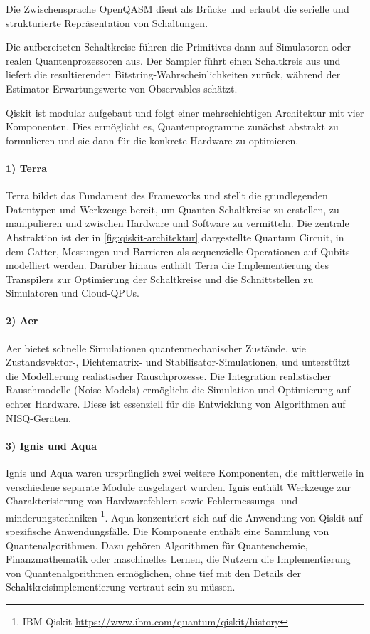 Die Zwischensprache OpenQASM dient als Brücke und erlaubt die serielle und strukturierte Repräsentation von Schaltungen. \autocite{cross_open_2017}

Die aufbereiteten Schaltkreise führen die Primitives dann auf Simulatoren oder realen Quantenprozessoren aus. Der Sampler führt einen Schaltkreis aus und liefert die resultierenden Bitstring-Wahrscheinlichkeiten zurück, während der Estimator Erwartungswerte von Observables schätzt.

Qiskit ist modular aufgebaut und folgt einer mehrschichtigen Architektur mit vier Komponenten. Dies ermöglicht es, Quantenprogramme zunächst abstrakt zu formulieren und sie dann für die konkrete Hardware zu optimieren. \autocite{javadi-abhari_quantum_2024}
\\

\paragraph{1) Terra}
Terra bildet das Fundament des Frameworks und stellt die grundlegenden Datentypen und Werkzeuge bereit, um Quanten-Schaltkreise zu erstellen, zu manipulieren und zwischen Hardware und Software zu vermitteln. Die zentrale Abstraktion ist der in \autoref{fig:qiskit-architektur} dargestellte Quantum Circuit, in dem Gatter, Messungen und Barrieren als sequenzielle Operationen auf Qubits modelliert werden. Darüber hinaus enthält Terra die Implementierung des Transpilers zur Optimierung der Schaltkreise und die Schnittstellen zu Simulatoren und Cloud-QPUs. \autocite{javadi-abhari_quantum_2024}
\\

\paragraph{2) Aer}
Aer bietet schnelle Simulationen quantenmechanischer Zustände, wie Zustands\-vektor\mbox{-}, Dichtematrix- und Stabilisator-Simulationen, und unterstützt die Modellierung realistischer Rauschprozesse. Die Integration realistischer Rauschmodelle (Noise Models) ermöglicht die Simulation und Optimierung auf echter Hardware. Diese ist essenziell für die Entwicklung von Algorithmen auf NISQ-Geräten. \autocite{javadi-abhari_quantum_2024}
\\

\paragraph{3) Ignis und Aqua}
Ignis und Aqua waren ursprünglich zwei weitere Komponenten, die mittlerweile in verschiedene separate Module ausgelagert wurden. Ignis enthält Werkzeuge zur Charakterisierung von Hardwarefehlern sowie Fehlermessungs- und -minderungstechniken \footnote{IBM Qiskit \url{https://www.ibm.com/quantum/qiskit/history}}. Aqua konzentriert sich auf die Anwendung von Qiskit auf spezifische Anwendungsfälle. Die Komponente enthält eine Sammlung von Quantenalgorithmen. Dazu gehören Algorithmen für Quantenchemie, Finanzmathematik oder maschinelles Lernen, die Nutzern die Implementierung von Quantenalgorithmen ermöglichen, ohne tief mit den Details der Schaltkreisimplementierung vertraut sein zu müssen. \autocite{javadi-abhari_quantum_2024}

